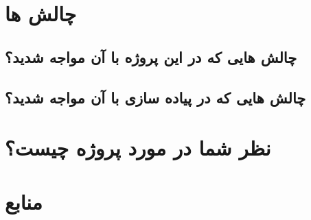\documentclass[12pt]{article}
\begin{document}
\newpage
\section{چالش ها}
\subsection{چالش هایی که در این پروژه با آن مواجه شدید؟}
\lipsum[2]
\subsection{چالش هایی که در پیاده سازی با آن مواجه شدید؟}
\lipsum[1]

\newpage

\section{نظر شما در مورد پروژه چیست؟}
\lipsum[3]
\newpage

\section{منابع}

\lipsum[4]


	
\end{document}
